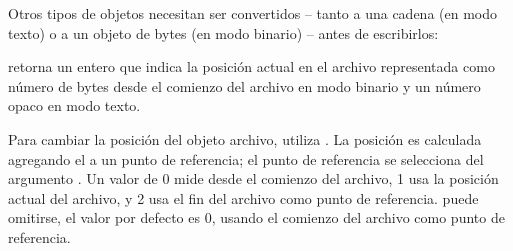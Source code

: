 \documentclass[a5paper,10pt,spanish]{sphinxmanual}
\begin{document}
\sphinxAtStartPar
Otros tipos de objetos necesitan ser convertidos – tanto a una cadena (en modo texto) o a un objeto de bytes (en modo binario) – antes de escribirlos:

\begin{sphinxVerbatim}[commandchars=\\\{\}]
   
    
\end{sphinxVerbatim}

\sphinxAtStartPar
{} retorna un entero que indica la posición actual en el archivo representada como número de bytes desde el comienzo del archivo en modo binario y un número opaco en modo texto.

\sphinxAtStartPar
Para cambiar la posición del objeto archivo, utiliza .  La posición es calculada agregando el  a un punto de referencia; el punto de referencia se selecciona del argumento .  Un valor  de 0 mide desde el comienzo del archivo, 1 usa la posición actual del archivo, y 2 usa el fin del archivo como punto de referencia.   puede omitirse, el valor por defecto es 0, usando el comienzo del archivo como punto de referencia.

\begin{sphinxVerbatim}[commandchars=\\\{\}]
   
      
   
\end{sphinxVerbatim}
\end{document}
